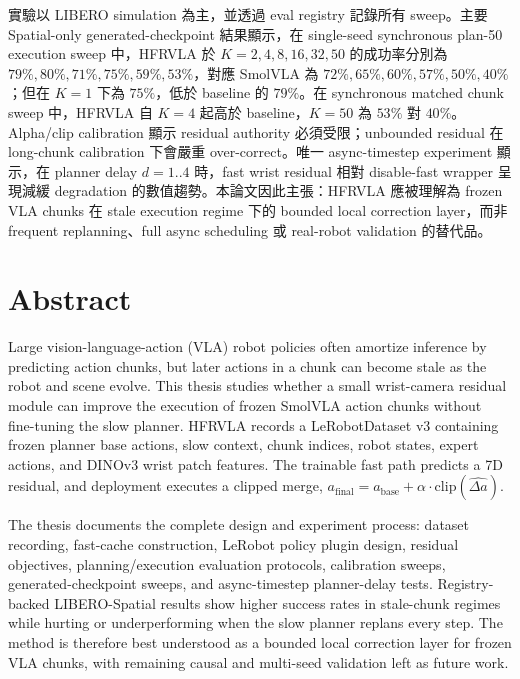\documentclass[12pt,a4paper,oneside]{report}
\newcommand{\method}{HFRVLA}
\newcommand{\smolvla}{SmolVLA}
\newcommand{\abase}{a_{\mathrm{base}}}
\newcommand{\afinal}{a_{\mathrm{final}}}
\newcommand{\deltah}{\hat{\Delta a}}
\newcommand{\clip}{\mathrm{clip}}
\begin{document}
實驗以 LIBERO simulation 為主，並透過 eval registry 記錄所有 sweep。主要 Spatial-only generated-checkpoint 結果顯示，在 single-seed synchronous plan-50 execution sweep 中，\method{} 於 $K=2,4,8,16,32,50$ 的成功率分別為 $79\%,80\%,71\%,75\%,59\%,53\%$，對應 \smolvla{} 為 $72\%,65\%,60\%,57\%,50\%,40\%$；但在 $K=1$ 下為 $75\%$，低於 baseline 的 $79\%$。在 synchronous matched chunk sweep 中，\method{} 自 $K=4$ 起高於 baseline，$K=50$ 為 $53\%$ 對 $40\%$。Alpha/clip calibration 顯示 residual authority 必須受限；unbounded residual 在 long-chunk calibration 下會嚴重 over-correct。唯一 async-timestep experiment 顯示，在 planner delay $d=1..4$ 時，fast wrist residual 相對 disable-fast wrapper 呈現減緩 degradation 的數值趨勢。本論文因此主張：\method{} 應被理解為 frozen VLA chunks 在 stale execution regime 下的 bounded local correction layer，而非 frequent replanning、full async scheduling 或 real-robot validation 的替代品。

\chapter*{Abstract}

Large vision-language-action (VLA) robot policies often amortize inference by predicting action chunks, but later actions in a chunk can become stale as the robot and scene evolve. This thesis studies whether a small wrist-camera residual module can improve the execution of frozen \smolvla{} action chunks without fine-tuning the slow planner. \method{} records a LeRobotDataset v3 containing frozen planner base actions, slow context, chunk indices, robot states, expert actions, and DINOv3 wrist patch features. The trainable fast path predicts a 7D residual, and deployment executes a clipped merge, $\afinal=\abase+\alpha\cdot\clip(\deltah)$.

The thesis documents the complete design and experiment process: dataset recording, fast-cache construction, LeRobot policy plugin design, residual objectives, planning/execution evaluation protocols, calibration sweeps, generated-checkpoint sweeps, and async-timestep planner-delay tests. Registry-backed LIBERO-Spatial results show higher success rates in stale-chunk regimes while hurting or underperforming when the slow planner replans every step. The method is therefore best understood as a bounded local correction layer for frozen VLA chunks, with remaining causal and multi-seed validation left as future work.

\tableofcontents
\listoffigures
\listoftables
\clearpage
{}
\end{document}

